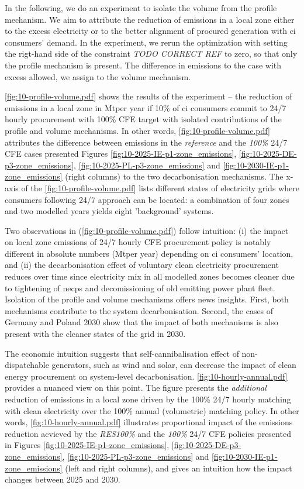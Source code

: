 In the following, we do an experiment to isolate the volume from the profile mechanism. 
We aim to attribute the reduction of \co emissions in a local zone either to the excess electricity or to the better alignment of procured generation with \gls{ci} consumers' demand.
In the experiment, we rerun the optimization with setting the rigt-hand side of the constraint \textit{TODO CORRECT REF} to zero, so that only the profile mechanism is present. The difference in emissions to the case with excess allowed, we assign to the volume mechanism. 

\cref{fig:10-profile-volume.pdf} shows the results of the experiment -- the reduction of emissions in a local zone in Mt\co per year if 10\% of \gls{ci} consumers commit to 24/7 hourly procurement with 100\% CFE target with isolated contributions of the profile and volume mechanisms.
In other words, \cref{fig:10-profile-volume.pdf} attributes the difference between emissions in the \textit{reference} and the \textit{100\%} 24/7 CFE cases presented  Figures \ref{fig:10-2025-IE-p1-zone_emissions}, \ref{fig:10-2025-DE-p3-zone_emissions}, \ref{fig:10-2025-PL-p3-zone_emissions} and \ref{fig:10-2030-IE-p1-zone_emissions} (right columns) to the two decarbonisation mechanisms. 
The x-axis of the \cref{fig:10-profile-volume.pdf} lists different states of electricity grids where consumers following 24/7 approach can be located: a combination of four zones and two modelled years yields eight 'background' systems. 

Two observations in (\cref{fig:10-profile-volume.pdf}) follow intuition: (i) the impact on local zone emissions of 24/7 hourly CFE procurement policy is notably different in absolute numbers (Mt\co per year) depending on \gls{ci} consumers' location, and (ii) the decarbonisation effect of voluntary clean electricity procurement reduces over time since electricity mix in all modelled zones becomes cleaner due to tightening of \gls{necp}s and decomissioning of old emitting power plant fleet. 
Isolation of the profile and volume mechanisms offers news insights. First, both mechanisms contribute to the system decarbonisation. Second, the cases of Germany and Poland 2030 show that the impact of both mechanisms is also present with the cleaner states of the grid in 2030.

The economic intuition suggests that self-cannibalisation effect of non-dispatchable generators, such as wind and solar, can decrease the impact of clean energy procurement on system-level decarbonisation.  
\cref{fig:10-hourly-annual.pdf} provides a nuanced view on this point.
The figure presents the \textit{additional} reduction of \co emissions in a local zone driven by the 100\% 24/7 hourly matching with clean electricity over the 100\% annual (volumetric) matching policy.
In other words, \cref{fig:10-hourly-annual.pdf} illustrates proportional impact of the emissions reduction acvieved by the \textit{RES100\%} and the \textit{100\%} 24/7 CFE policies presented in Figures \ref{fig:10-2025-IE-p1-zone_emissions}, \ref{fig:10-2025-DE-p3-zone_emissions}, \ref{fig:10-2025-PL-p3-zone_emissions} and \ref{fig:10-2030-IE-p1-zone_emissions} (left and right columns), and gives an intuition how the impact changes between 2025 and 2030. 

